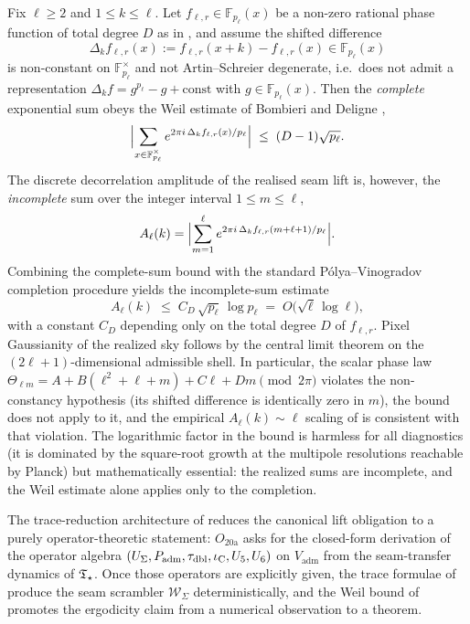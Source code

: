 \begin{lemma}
\label{lem:decorrelation-weil-bound}
Fix $\ell\ge2$ and $1\le k\le\ell$. Let $f_{\ell,r}\in\mathbb F_{p_\ell}(x)$ be a non-zero rational
phase function of total degree $D$ as in , and assume the shifted
difference
\[
\Delta_k f_{\ell,r}(x):=f_{\ell,r}(x+k)-f_{\ell,r}(x)\in\mathbb F_{p_\ell}(x)
\]
is non-constant on $\mathbb F_{p_\ell}^\times$ and not Artin--Schreier degenerate, i.e.\ does not
admit a representation $\Delta_k f=g^{p_\ell}-g+\mathrm{const}$ with
$g\in\mathbb F_{p_\ell}(x)$. Then the \emph{complete} exponential sum obeys the Weil estimate of
Bombieri \cite{Bombieri1966} and Deligne \cite{DeligneWeil},
\[
\Bigl|\sum_{x\in\mathbb F_{p_\ell}^\times}
e^{2\pi i\,\Delta_k f_{\ell,r}(x)/p_\ell}\Bigr|
\;\le\;(D-1)\sqrt{p_\ell}.
\]
The discrete decorrelation amplitude of the realised seam lift is, however, the
\emph{incomplete} sum over the integer interval $1\le m\le\ell$,
\[
A_\ell(k)
=\Bigl|\sum_{m=1}^{\ell}
e^{2\pi i\,\Delta_k f_{\ell,r}(m+\ell+1)/p_\ell}\Bigr|.
\]
Combining the complete-sum bound with the standard P\'olya--Vinogradov
\cite{PolyaVinogradov} completion procedure yields the incomplete-sum estimate
\[
A_\ell(k)\;\le\;C_D\,\sqrt{p_\ell}\,\log p_\ell
\;=\;O\!\bigl(\sqrt{\ell}\,\log\ell\bigr),
\]
with a constant $C_D$ depending only on the total degree $D$ of $f_{\ell,r}$. Pixel Gaussianity of
the realized sky follows by the central limit theorem on the $(2\ell+1)$-dimensional admissible
shell. In particular, the scalar phase law
$\Theta_{\ell m}=A+B(\ell^2+\ell+m)+C\ell+Dm\pmod{2\pi}$ violates the non-constancy hypothesis
(its shifted difference is identically zero in $m$), the bound does not apply to it, and the
empirical $A_\ell(k)\sim\ell$ scaling of  is consistent with that
violation. The logarithmic factor in the bound is harmless for all
diagnostics (it is dominated by the
square-root growth at the multipole resolutions reachable by Planck) but mathematically essential:
the realized sums are incomplete, and the Weil estimate alone applies only to the completion.
\end{lemma}

\begin{remark}
\label{rem:o20a-operator-level}
The trace-reduction architecture of  reduces the canonical lift
obligation to a purely operator-theoretic statement: $O_{20\mathrm{a}}$ asks for the closed-form
derivation of the operator algebra $(U_\Sigma,P_{\mathrm{adm}},\tau_{\mathrm{dbl}},\iota_{\mathrm C},U_5,U_6)$ on $V_{\mathrm{adm}}$
from the seam-transfer dynamics of $\mathfrak T_{\star}$. Once those operators are explicitly given, the trace
formulae of  produce the seam scrambler $\mathcal W_\Sigma$
deterministically, and the Weil bound of  promotes the
ergodicity claim from a numerical observation to a theorem.
\end{remark}

